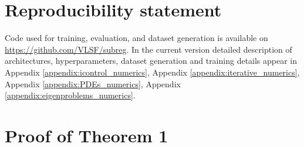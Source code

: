 \documentclass{article}
\begin{document}
\section{Reproducibility statement}
Code used for training, evaluation, and dataset generation is available on \url{https://github.com/VLSF/subreg}. In the current version detailed description of architectures, hyperparameters, dataset generation and training details appear in Appendix \ref{appendix:icontrol_numerics}, Appendix \ref{appendix:iterative_numerics}, Appendix \ref{appendix:PDEs_numerics}, Appendix \ref{appendix:eigenproblems_numerics}.



\appendix
\section{Proof of Theorem 1}
\label{appendix:theorem_1}
\end{document}
